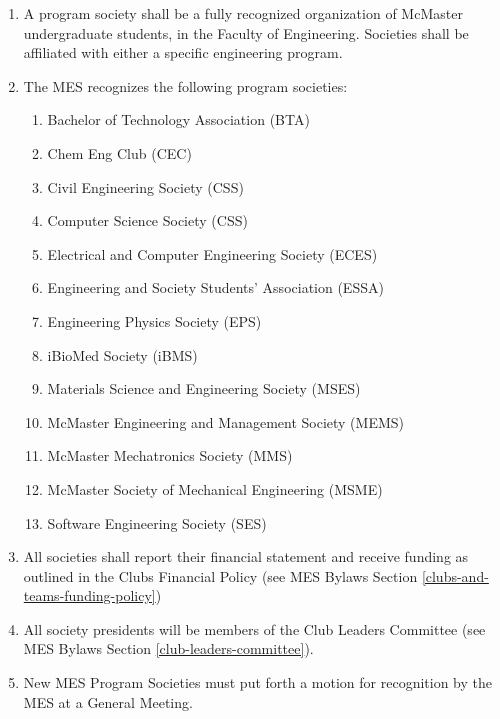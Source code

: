 \begin{enumerate}
 \item
  A program society shall be a fully recognized organization of McMaster
  undergraduate students, in the Faculty of Engineering. Societies shall
  be affiliated with either a specific engineering program.
 \item
  The MES recognizes the following program societies:

  \begin{enumerate}
   \item
    Bachelor of Technology Association (BTA)
   \item
    Chem Eng Club (CEC)
   \item
    Civil Engineering Society (CSS)
   \item
    Computer Science Society (CSS)
   \item
    Electrical and Computer Engineering Society (ECES)
   \item
    Engineering and Society Students' Association (ESSA)
   \item
    Engineering Physics Society (EPS)
   \item
    iBioMed Society (iBMS)
   \item
    Materials Science and Engineering Society (MSES)
   \item
    McMaster Engineering and Management Society (MEMS)
   \item
    McMaster Mechatronics Society (MMS)
   \item
    McMaster Society of Mechanical Engineering (MSME)
   \item
    Software Engineering Society (SES)
  \end{enumerate}
 \item
  All societies shall report their financial statement and receive
  funding as outlined in the Clubs Financial Policy (see MES Bylaws
  Section \ref{clubs-and-teams-funding-policy})
 \item
  All society presidents will be members of the Club Leaders Committee
  (see MES Bylaws Section \ref{club-leaders-committee}).
 \item
  New MES Program Societies must put forth a motion for recognition by
  the MES at a General Meeting.

\end{enumerate}


